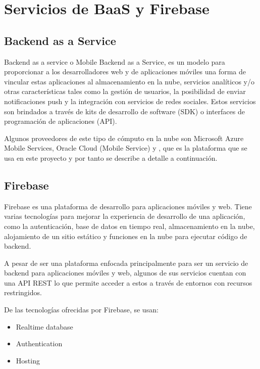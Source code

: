 
\section{Servicios de BaaS y Firebase}
\label{\detokenize{chapter_one/firebase:servicios-de-baas-y-firebase}}\label{\detokenize{chapter_one/firebase::doc}}

\subsection{Backend as a Service}
\label{\detokenize{chapter_one/firebase:backend-as-a-service}}

\begin{remark}
Backend as a service o Mobile Backend as a Service, es un
modelo para proporcionar a los desarrolladores web y
de aplicaciones móviles una forma de vincular estas aplicaciones
al almacenamiento en la nube, servicios analíticos
y/o otras características tales como la gestión de usuarios,
la posibilidad de enviar notificaciones push y la integración
con servicios de redes sociales. Estos servicios son brindados
a través de kits de desarrollo de software (SDK) o
interfaces de programación de aplicaciones (API). 
\end{remark}
Algunos proveedores
de este tipo de cómputo en la nube son Microsoft Azure Mobile Services,
Oracle Cloud (Mobile Service) y , que es la plataforma
que se usa en este proyecto y por tanto se describe a detalle a
continuación.


\subsection{Firebase}
\label{\detokenize{chapter_one/firebase:firebase}}
Firebase es una plataforma de desarrollo para aplicaciones móviles y web.
Tiene varias tecnologías para mejorar la experiencia de desarrollo de una
aplicación, como la autenticación, base de datos en tiempo real,
almacenamiento en la nube, alojamiento de un sitio estático y funciones en la
nube para ejecutar código de backend.

A pesar de ser una plataforma enfocada principalmente para ser un servicio de
backend para aplicaciones móviles y web, algunos de sus servicios cuentan con
una API REST lo que permite acceder a estos a través de entornos con recursos
restringidos.

De las tecnologías ofrecidas por Firebase, se usan:
\begin{itemize}
\item {} 
Realtime database

\item {} 
Authentication

\item {} 
Hosting

\end{itemize}


